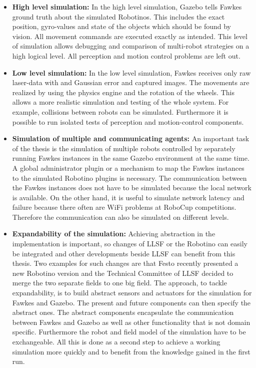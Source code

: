 \documentclass[a4paper,11pt]{article}
\begin{document}
\begin{itemize}
\item \textbf{High level simulation:} In the high level simulation, Gazebo tells Fawkes ground truth about the simulated Robotinos. This includes the exact position, gyro-values and state of the objects which should be found by vision. All movement commands are executed exactly as intended. This level of simulation allows debugging and comparison of multi-robot strategies on a high logical level. All perception and motion control problems are left out.
\item \textbf{Low level simulation:} In the low level simulation, Fawkes receives only raw laser-data with and Gaussian error and captured images. The movements are realized by using the physics engine and the rotation of the wheels. This allows a more realistic simulation and testing of the whole system. For example, collisions between robots can be simulated. Furthermore it is possible to run isolated tests of perception and motion-control components.
\item \textbf{Simulation of multiple and communicating agents:} An important task of the thesis is the simulation of multiple robots controlled by separately running Fawkes instances in the same Gazebo environment at the same time. A global administrator plugin or a mechanism to map the Fawkes instances to the simulated Robotino plugins is necessary. The communication between the Fawkes instances does not have to be simulated because the local network is available. On the other hand, it is useful to simulate network latency and failure because there often are WiFi problems at RoboCup competitions. Therefore the communication can also be simulated on different levels.\\
\item \textbf{Expandability of the simulation:} Achieving abstraction in the implementation is important, so changes of LLSF or the Robotino can easily be integrated and other developments beside LLSF can benefit from this thesis. Two examples for such changes are that Festo recently presented a new Robotino version and the Technical Committee of LLSF decided to merge the two separate fields to one big field. The approach, to tackle expandability, is to build abstract sensors and actuators for the simulation for Fawkes and Gazebo. The present and future components can then specify the abstract ones. The abstract components encapsulate the communication between Fawkes and Gazebo as well as other functionality that is not domain specific. Furthermore the robot and field model of the simulation have to be exchangeable. All this is done as a second step to achieve a working simulation more quickly and to benefit from the knowledge gained in the first run.

\end{itemize}
\end{document}
